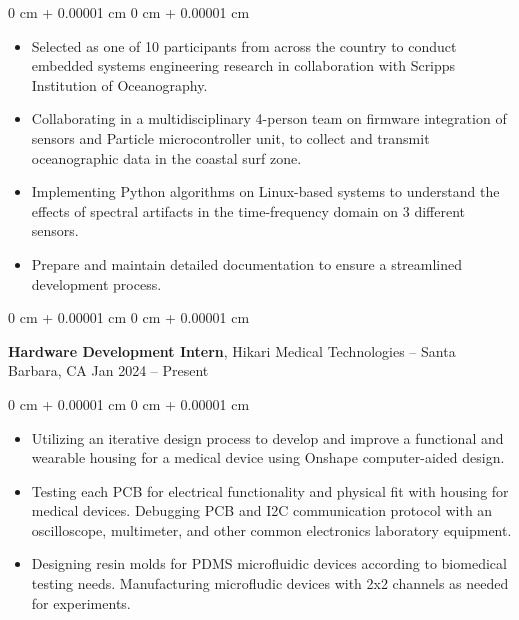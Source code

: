 \documentclass[10pt, letterpaper]{article}
\newenvironment{highlights}{
    \begin{itemize}[
        topsep=0.10 cm,
        parsep=0.10 cm,
        partopsep=0pt,
        itemsep=0pt,
        leftmargin=0 cm + 10pt
    ]
}{
    \end{itemize}
} %
\newenvironment{onecolentry}{
    \begin{adjustwidth}{
        0 cm + 0.00001 cm
    }{
        0 cm + 0.00001 cm
    }
}{
    \end{adjustwidth}
} %
\newenvironment{twocolentry}[2][]{
    \onecolentry
    \def\secondColumn{#2}
    \setcolumnwidth{\fill, 4.5 cm}
    \begin{paracol}{2}
}{
    \switchcolumn \raggedleft \secondColumn
    \end{paracol}
    \endonecolentry
} %
\begin{document}
    \vspace{0.1 cm}

    \begin{onecolentry}
        \begin{highlights}
            \item Selected as one of 10 participants from across the country to conduct embedded systems engineering research in collaboration with Scripps Institution of Oceanography.
            \item Collaborating in a multidisciplinary 4-person team on firmware integration of sensors and Particle microcontroller unit, to collect and transmit oceanographic data in the coastal surf zone.
            \item Implementing Python algorithms on Linux-based systems to understand the effects of spectral artifacts in the time-frequency domain on 3 different sensors. 
            \item Prepare and maintain detailed documentation to ensure a streamlined development process.
        \end{highlights}
    \end{onecolentry}


    
    \vspace{0.2 cm}
    
    \begin{twocolentry}{
            Jan 2024 – Present
        }
            \textbf{Hardware Development Intern}, Hikari Medical Technologies -- Santa Barbara, CA\end{twocolentry}

        \vspace{0.10 cm}
        \begin{onecolentry}
            \begin{highlights}
                \item Utilizing an iterative design process to develop and improve a functional and wearable housing for a medical device using Onshape computer-aided design.
                \item Testing each PCB for electrical functionality and physical fit with housing for medical devices. Debugging PCB and I2C communication protocol with an oscilloscope, multimeter, and other common electronics laboratory equipment.
                \item Designing resin molds for PDMS microfluidic devices according to biomedical testing needs. Manufacturing microfludic devices with 2x2 channels as needed for experiments.
            \end{highlights}
        \end{onecolentry}
\end{document}

